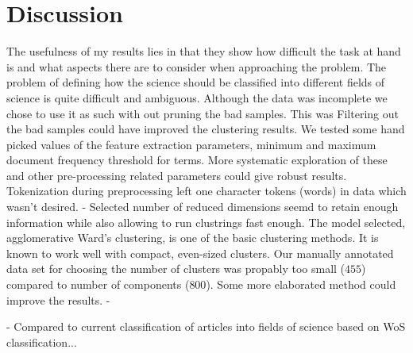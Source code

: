 \chapter{Discussion}
\label{chapter:discussion}

The usefulness of my results lies in that they show how difficult
the task at hand is and what aspects there are to consider when
approaching the problem.
The problem of defining how the science should be classified into
different fields of science is quite difficult and ambiguous.
Although the data was incomplete we chose to use it as such with out 
pruning the bad samples. This was 
Filtering out the bad samples could have improved the clustering 
results.
We tested some hand picked values of the feature extraction 
parameters, minimum and maximum document frequency threshold for 
terms. More systematic exploration of these and other 
pre-processing related parameters could give robust results.
Tokenization during preprocessing left one character tokens (words)
in data which wasn't desired.
- 
Selected number of reduced dimensions seemd to retain enough
information while also allowing to run clustrings fast enough.
The model selected, agglomerative Ward's clustering, is one of the
basic clustering methods. It is known to work well with compact,
even-sized clusters.
Our manually annotated data set for choosing the number of clusters
was propably too small ($455$) compared to number of components 
($800$). Some more elaborated method could improve the results. 
- 

- Compared to current classification of articles into fields of 
science based on WoS classification...



